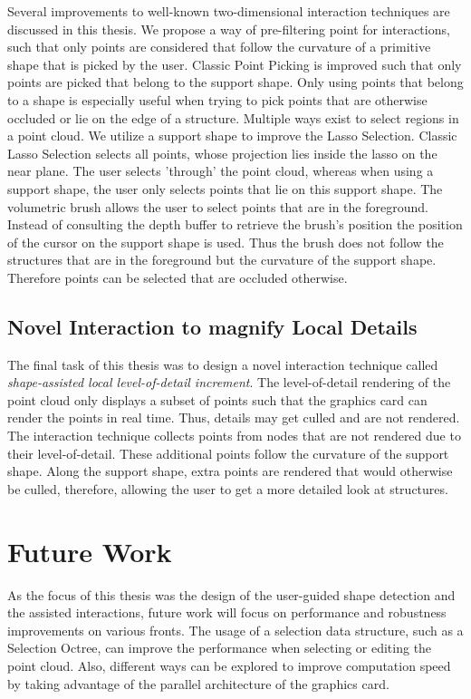 Several improvements to well-known two-dimensional interaction techniques are discussed in this thesis. We propose a way of pre-filtering point for interactions, such that only points are considered that follow the curvature of a primitive shape that is picked by the user. Classic Point Picking is improved such that only points are picked that belong to the support shape. Only using points that belong to a shape is especially useful when trying to pick points that are otherwise occluded or lie on the edge of a structure. Multiple ways exist to select regions in a point cloud. We utilize a support shape to improve the Lasso Selection. Classic Lasso Selection selects all points, whose projection lies inside the lasso on the near plane. The user selects 'through' the point cloud, whereas when using a support shape, the user only selects points that lie on this support shape. The volumetric brush allows the user to select points that are in the foreground. Instead of consulting the depth buffer to retrieve the brush's position the position of the cursor on the support shape is used. Thus the brush does not follow the structures that are in the foreground but the curvature of the support shape. Therefore points can be selected that are occluded otherwise. 


\subsection{Novel Interaction to magnify Local Details}

The final task of this thesis was to design a novel interaction technique called \textit{shape-assisted local level-of-detail increment}. The level-of-detail rendering of the point cloud only displays a subset of points such that the graphics card can render the points in real time. Thus, details may get culled and are not rendered. The interaction technique collects points from nodes that are not rendered due to their level-of-detail. These additional points follow the curvature of the support shape. Along the support shape, extra points are rendered that would otherwise be culled, therefore, allowing the user to get a more detailed look at structures. 


\section{Future Work}

As the focus of this thesis was the design of the user-guided shape detection and the assisted interactions, future work will focus on performance and robustness improvements on various fronts. The usage of a selection data structure, such as a Selection Octree\cite{scheiblauer2011out}, can improve the performance when selecting or editing the point cloud. Also, different ways can be explored to improve computation speed by taking advantage of the parallel architecture of the graphics card. 
\\

